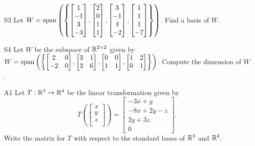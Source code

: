 \documentclass{sbgLAsemi}
\begin{document}
\begin{problem}{S3}
Let $W={\rm span}\left( \left\{ \begin{bmatrix} 1 \\ -1 \\ 3 \\ -3 \end{bmatrix},\begin{bmatrix} 2 \\ 0 \\ 1 \\ 1 \end{bmatrix}, \begin{bmatrix} 3 \\ -1 \\ 4 \\ -2 \end{bmatrix},  \begin{bmatrix} 1 \\ 1 \\ 1 \\ -7 \end{bmatrix} \right\}\right)$.  Find a basis of $W$.
\end{problem}

\begin{problem}{S4}
Let $W$ be the subspace of $\mathbb{R}^{2\times2}$ given by $W={\rm span}\left(\left\{\begin{bmatrix} 2 & 0 \\ -2 & 0 \end{bmatrix}, \begin{bmatrix} 3 & 1 \\ 3 & 6 \end{bmatrix}, \begin{bmatrix} 0 & 0 \\ 1 & 1 \end{bmatrix}, \begin{bmatrix}1 & 2 \\ 0 & 1 \end{bmatrix}\right\}\right)$. Compute the dimension of $W$.
\end{problem}

\begin{problem}{A1}
Let $T: \mathbb{R}^3\rightarrow \mathbb{R}^4$ be the linear transformation given by $$T\left(\begin{bmatrix} x \\ y \\ z \\  \end{bmatrix} \right) = \begin{bmatrix} -3x+y \\ -8x+2y-z \\ 2y+3z \\ 0 \end{bmatrix}.$$  Write the matrix for $T$ with respect to the standard bases of $\mathbb{R}^3$ and $\mathbb{R}^4$.
\end{problem}
\end{document}
